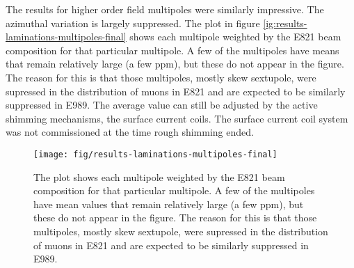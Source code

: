 The results for higher order field multipoles were similarly impressive.  The azimuthal variation is largely suppressed.  The plot in figure \ref{ig:results-laminations-multipoles-final} shows each multipole weighted by the E821 beam composition for that particular multipole.  A few of the multipoles have means that remain relatively large (a few ppm), but these do not appear in the figure.  The reason for this is that those multipoles, mostly skew sextupole, were supressed in the distribution of muons in E821 and are expected to be similarly suppressed in E989.  The average value can still be adjusted by the active shimming mechanisms, the surface current coils.  The surface current coil system was not commissioned at the time rough shimming ended.

\begin{figure}
\label{fig:results-laminations-multipoles-final}
\texttt{[image: fig/results-laminations-multipoles-final]}
\caption{The plot shows each multipole weighted by the E821 beam composition for that particular multipole.  A few of the multipoles have mean values that remain relatively large (a few ppm), but these do not appear in the figure.  The reason for this is that those multipoles, mostly skew sextupole, were supressed in the distribution of muons in E821 and are expected to be similarly suppressed in E989.}
\end{figure}
